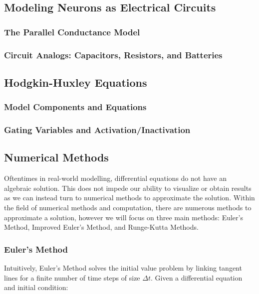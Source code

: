 \documentclass{article} %
\begin{document}
\begin{multicols}{2}
\subsection{Modeling Neurons as Electrical Circuits}
\label{subsec:circuit_model}
\subsubsection{The Parallel Conductance Model}
\label{subsubsec:parallel_conductance}
\subsubsection{Circuit Analogs: Capacitors, Resistors, and Batteries}
\label{subsubsec:circuit_analogs}

\subsection{Hodgkin-Huxley Equations}
\label{subsec:hodgekin_huxley}
\subsubsection{Model Components and Equations}
\label{subsubsec:hh_equations}
\subsubsection{Gating Variables and Activation/Inactivation}
\label{subsubsec:gating_variables}

\subsection{Numerical Methods}
\label{subsec:numerical_methods}

Oftentimes in real-world modelling, differential equations do not have an algebraic solution.
This does not impede our ability to visualize or obtain results as we can instead turn to numerical methods to approximate the solution.
Within the field of numerical methods and computation, there are numerous methods to approximate a solution, however we will focus on three main methods: Euler's Method, Improved Euler's Method, and Runge-Kutta Methods.

\subsubsection{Euler's Method}
\label{subsubsec:euler_method}

Intuitively, Euler's Method solves the initial value problem by linking tangent lines for a finite number of time steps of size $\Delta t$.
Given a differential equation and initial condition:


\end{multicols}
\end{document}
